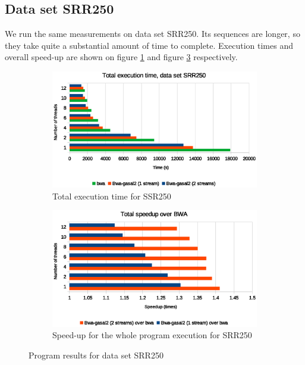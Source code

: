 \subsection{Data set SRR250}

We run the same measurements on data set SRR250. Its sequences are longer, so they take quite a substantial amount of time to complete. Execution times and overall speed-up are shown on figure \ref{fig:total-exec-time-srr250} and figure \ref{fig:total-exec-speed-up-srr250} respectively.


\begin{figure}[p]
	\centering
	\begin{subfigure}[t]{1\textwidth}
		\centering
		\includegraphics[width=1\textwidth]{srr250/total-exec-time-srr250}
		\caption{Total execution time for SSR250}
		\label{fig:total-exec-time-srr250}
	\end{subfigure}%
	
	\begin{subfigure}[b]{1\textwidth}
		\centering
		\includegraphics[width=1\textwidth]{srr250/total-exec-speed-up-srr250}
		\caption{Speed-up for the whole program execution for SRR250}
		\label{fig:total-exec-speed-up-srr250}
	\end{subfigure}
	\caption{Program results for data set SRR250}
\end{figure}

